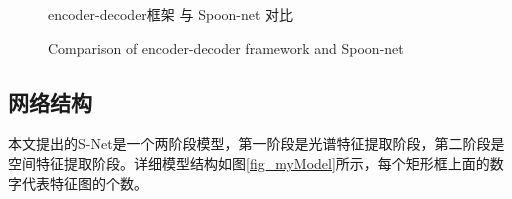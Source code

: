 \documentclass[10pt,UTF8,fntef]{ctexart}
\begin{document}
\begin{multicols}{2}
\begin{figure}[H]
    \centering
    \caption{encoder-decoder框架 与 Spoon-net 对比}
    \addtocounter{figure}{-1}
    \vspace{-5pt}
    \renewcommand{\figurename}{Fig}
    \caption{Comparison of encoder-decoder framework and Spoon-net}
    \renewcommand{\figurename}{图}

    \label{fig:spoon_simple}
\end{figure}

\subsection{网络结构}
本文提出的S-Net是一个两阶段模型，第一阶段是光谱特征提取阶段，第二阶段是空间特征提取阶段。详细模型结构如图\ref{fig_myModel}所示，每个矩形框上面的数字代表特征图的个数。
\end{multicols}
\end{document}
